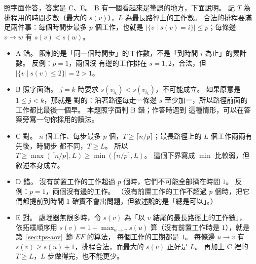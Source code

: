 照字面作答，答案是 C、E。 B 有一個看起來是筆誤的地方，下面說明。 記 $T$ 為排程用的時間步數（最大的
$s(v)$），$L$ 為最長路徑上的工作數。 合法的排程要滿足兩件事：每個時間步最多 $p$ 個工作，也就是
$|\{v \mid s(v) = i\}| \le p$；每條邊 $v \to w$ 有 $s(v) < s(w)$。
\begin{itemize}
\item A 錯。 限制的是「同一個時間步」的工作數，不是「到時間 $i$ 為止」的累計數。 反例：$p = 1$，兩個沒
有邊的工作排在 $s = 1, 2$，合法，但 $|\{v \mid s(v) \le 2\}| = 2 > 1$。
\item B 照字面錯。 $j = k$ 時要求 $s(v_{i_k}) < s(v_{i_k})$，不可能成立。 如果原意是 $1 \le j < k$，那就是
對的：沿著路徑每走一條邊 $s$ 至少加一，所以路徑前面的工作都比最後一個早。 本題照字面判 B 錯；作答時遇到
這種情形，可以在答案旁寫一句你採用的讀法。
\item C 對。 $n$ 個工作、每步最多 $p$ 個，$T \ge \lceil n/p \rceil$；最長路徑上的 $L$ 個工作兩兩有先後，時間步
都不同，$T \ge L$。 所以 $T \ge \max(\lceil n/p \rceil, L) \ge \min(\lceil n/p \rceil, L)$。 這個下界寫成
$\min$ 比較弱，但敘述本身成立。
\item D 錯。 沒有前置工作的工作超過 $p$ 個時，它們不可能全部擠在時間 $1$。 反例：$p = 1$，兩個沒有邊的工作。
（沒有前置工作的工作不超過 $p$ 個時，把它們都提前到時間 $1$ 確實不會出問題，但敘述說的是「總是可以」。）
\item E 對。 處理器無限多時，令 $s(v)$ 為「以 $v$ 結尾的最長路徑上的工作數」，依拓樸順序用
$s(v) = 1 + \max_{u \to v} s(u)$ 算（沒有前置工作時是 $1$），就是第~\ref{sec:tps-aov}~節 $\mathit{EF}$ 的算法，
每個工作的工期都是 $1$。 每條邊 $u \to v$ 有 $s(v) \ge s(u) + 1$，排程合法，而最大的 $s(v)$ 正好是 $L$。 再加上
C 裡的 $T \ge L$，$L$ 步做得完，也不能更少。
\end{itemize}
